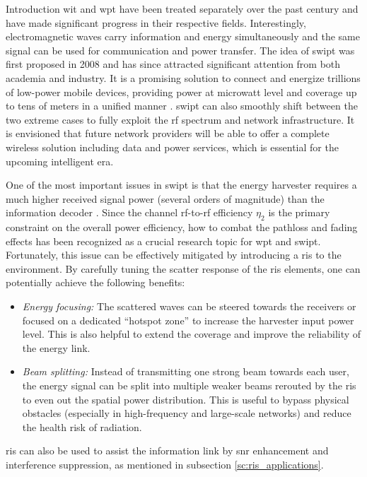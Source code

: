 \begin{section}{}\label{sc:swipt}
	\begin{subsection}{Introduction}
		\gls{wit} and \gls{wpt} have been treated separately over the past century and have made significant progress in their respective fields.
		Interestingly, electromagnetic waves carry information and energy simultaneously and the same signal can be used for communication and power transfer.
		The idea of \gls{swipt} was first proposed in 2008 \cite{Varshney2008} and has since attracted significant attention from both academia and industry.
		It is a promising solution to connect and energize trillions of low-power mobile devices, providing power at microwatt level and coverage up to tens of meters in a unified manner \cite{Clerckx2018b}.
		\gls{swipt} can also smoothly shift between the two extreme cases to fully exploit the \gls{rf} spectrum and network infrastructure.
		It is envisioned that future network providers will be able to offer a complete wireless solution including data and power services, which is essential for the upcoming intelligent era.

		One of the most important issues in \gls{swipt} is that the energy harvester requires a much higher received signal power (several orders of magnitude) than the information decoder \cite{Clerckx2019}.
		Since the channel \gls{rf}-to-\gls{rf} efficiency $\eta_2$ is the primary constraint on the overall power efficiency, how to combat the pathloss and fading effects has been recognized as a crucial research topic for \gls{wpt} and \gls{swipt}.
		Fortunately, this issue can be effectively mitigated by introducing a \gls{ris} to the environment.
		By carefully tuning the scatter response of the \gls{ris} elements, one can potentially achieve the following benefits:
		\begin{itemize}
			\item \emph{Energy focusing:} The scattered waves can be steered towards the receivers or focused on a dedicated ``hotspot zone'' to increase the harvester input power level. This is also helpful to extend the coverage and improve the reliability of the energy link.
			\item \emph{Beam splitting:} Instead of transmitting one strong beam towards each user, the energy signal can be split into multiple weaker beams rerouted by the \gls{ris} to even out the spatial power distribution. This is useful to bypass physical obstacles (especially in high-frequency and large-scale networks) and reduce the health risk of radiation.
		\end{itemize}
		\gls{ris} can also be used to assist the information link by \gls{snr} enhancement and interference suppression, as mentioned in subsection \ref{sc:ris_applications}.
	\end{subsection}


\end{section}
